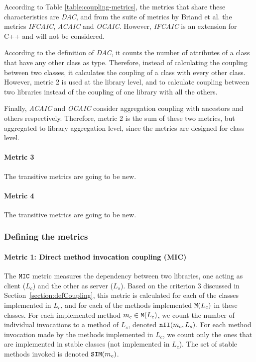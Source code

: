 According to Table \ref{table:coupling-metrics}, the metrics that share these characteristics are \textit{DAC}, and from the suite of metrics by Briand et al. the metrics \textit{IFCAIC}, \textit{ACAIC} and \textit{OCAIC}. However, \textit{IFCAIC} is an extension for C++ and will not be considered.

According to the definition of \textit{DAC}, it counts the number of attributes of a class that have any other class as type. Therefore, instead of calculating the coupling between two classes, it calculates the coupling of a class with every other class. However, metric 2 is used at the library level, and to calculate coupling between two libraries instead of the coupling of one library with all the others.

Finally, \textit{ACAIC} and \textit{OCAIC} consider aggregation coupling with ancestors and others respectively. Therefore, metric 2 is the sum of these two metrics, but aggregated to library aggregation level, since the metrics are designed for class level.

\paragraph{Metric 3}
The transitive metrics are going to be new.

\paragraph{Metric 4}
The transitive metrics are going to be new.


\subsubsection{Defining the metrics}\label{subsec:metric-definition}
\paragraph{Metric 1: Direct method invocation coupling (MIC)}
The $\verb|MIC|$ metric measures the dependency between two libraries, one acting as client ($L_c$) and the other as server ($L_s$).%
Based on the criterion 3 discussed in Section~\ref{section:defCoupling}, this metric is calculated for each of the classes implemented in $L_c$, and for each of the methods implemented $\verb|M|(L_c)$ in these classes. For each implemented method  $m_c \in \verb|M|(L_c)$, we count the number of individual invocations to a method of $L_s$, denoted $\verb|nII|(m_c,L_s)$. For each method invocation made by the methods implemented in $L_c$, we count only the ones that are implemented in stable classes (not implemented in $L_c$). The set of stable methods invoked is denoted $\verb|SIM|(m_c)$.

